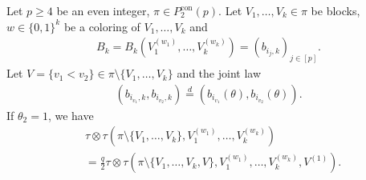 \documentclass[12pt,reqno]{amsart}
\theoremstyle{plain}
\newcommand{\1}{\mathbf{1}}
\begin{document}
\begin{lemma}[Case $\theta_2=1$]\label{lemma: case theta_2=1}
    Let $p \ge 4$ be an even integer, $\pi \in P_2^{\operatorname{con}}(p)$. Let $V_1,\ldots,V_k \in \pi$ be blocks, $w \in \{0,1\}^k$ be a coloring of $V_1,\ldots,V_k$ and
    \begin{align*}
        B_k=B_k\left(V_1^{(w_1)},\ldots,V_k^{(w_k)}\right)=\left(b_{i_j,k}\right)_{j \in [p]}.
    \end{align*}
    Let $V=\{v_1<v_2\} \in \pi\setminus \{V_1,\ldots,V_{k}\}$ and the joint law 
    \begin{align*}
        \left(b_{i_{v_1},k},b_{i_{v_2},k}\right)\overset{d}{=}\left(b_{i_{v_1}}(\theta),b_{i_{v_2}}(\theta)\right).
    \end{align*}
    If $\theta_2=1$, we have
    \begin{align*}
        &\tau\otimes\tau \left(\pi\setminus \{V_1,\ldots,V_{k}\},V_1^{(w_1)},\ldots,V_{k}^{(w_{k})}\right)\\
        &=\frac{q}{2}\tau\otimes\tau \left(\pi\setminus \{V_1,\ldots,V_{k},V\},V_1^{(w_1)},\ldots,V_{k}^{(w_{k})},V^{(1)}\right).
    \end{align*}
\end{lemma}
\end{document}

